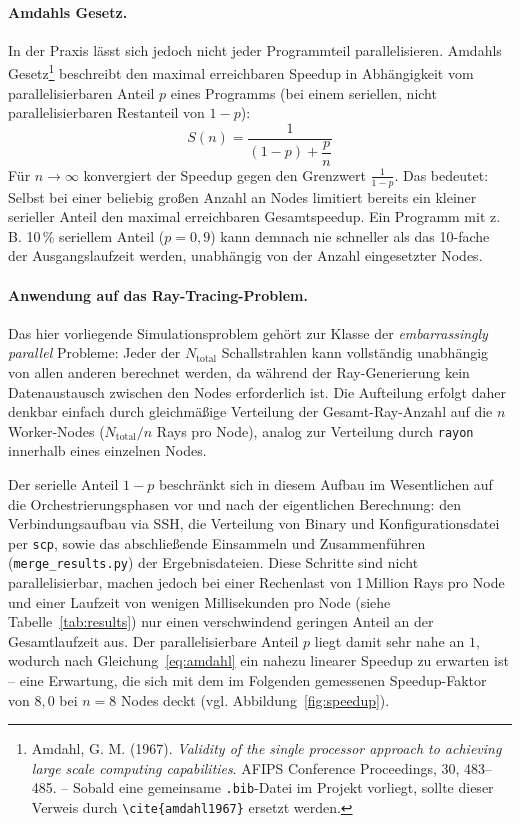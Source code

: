 \paragraph{Amdahls Gesetz.}
In der Praxis lässt sich jedoch nicht jeder Programmteil parallelisieren.
Amdahls Gesetz\footnote{Amdahl, G. M. (1967). \emph{Validity of the
single processor approach to achieving large scale computing
capabilities}. AFIPS Conference Proceedings, 30, 483--485. --
Sobald eine gemeinsame \texttt{.bib}-Datei im Projekt vorliegt, sollte
dieser Verweis durch \texttt{\textbackslash cite\{amdahl1967\}}
ersetzt werden.} beschreibt den maximal erreichbaren
Speedup in Abhängigkeit vom parallelisierbaren Anteil $p$ eines Programms
(bei einem seriellen, nicht parallelisierbaren Restanteil von $1-p$):
\begin{equation}
    S(n) = \frac{1}{(1-p) + \dfrac{p}{n}}
    \label{eq:amdahl}
\end{equation}
Für $n \to \infty$ konvergiert der Speedup gegen den Grenzwert
$\frac{1}{1-p}$. Das bedeutet: Selbst bei einer beliebig großen Anzahl an
Nodes limitiert bereits ein kleiner serieller Anteil den maximal
erreichbaren Gesamtspeedup. Ein Programm mit z.\,B. 10\,\% seriellem
Anteil ($p = 0{,}9$) kann demnach nie schneller als das 10-fache der
Ausgangslaufzeit werden, unabhängig von der Anzahl eingesetzter Nodes.

\paragraph{Anwendung auf das Ray-Tracing-Problem.}
Das hier vorliegende Simulationsproblem gehört zur Klasse der
\emph{embarrassingly parallel} Probleme: Jeder der $N_{\text{total}}$
Schallstrahlen kann vollständig unabhängig von allen anderen berechnet
werden, da während der Ray-Generierung kein Datenaustausch zwischen den
Nodes erforderlich ist. Die Aufteilung erfolgt daher denkbar einfach durch
gleichmäßige Verteilung der Gesamt-Ray-Anzahl auf die $n$ Worker-Nodes
($N_{\text{total}} / n$ Rays pro Node), analog zur Verteilung durch
\texttt{rayon} innerhalb eines einzelnen Nodes.

Der serielle Anteil $1-p$ beschränkt sich in diesem Aufbau im Wesentlichen
auf die Orchestrierungsphasen vor und nach der eigentlichen Berechnung:
den Verbindungsaufbau via SSH, die Verteilung von Binary und
Konfigurationsdatei per \texttt{scp}, sowie das abschließende Einsammeln
und Zusammenführen (\texttt{merge\_results.py}) der Ergebnisdateien. Diese
Schritte sind nicht parallelisierbar, machen jedoch bei einer
Rechenlast von 1\,Million Rays pro Node und einer Laufzeit von wenigen
Millisekunden pro Node (siehe Tabelle~\ref{tab:results}) nur einen
verschwindend geringen Anteil an der Gesamtlaufzeit aus. Der
parallelisierbare Anteil $p$ liegt damit sehr nahe an $1$, wodurch nach
Gleichung~\eqref{eq:amdahl} ein nahezu linearer Speedup zu erwarten ist
-- eine Erwartung, die sich mit dem im Folgenden gemessenen
Speedup-Faktor von $8{,}0$ bei $n=8$ Nodes deckt
(vgl. Abbildung~\ref{fig:speedup}).

